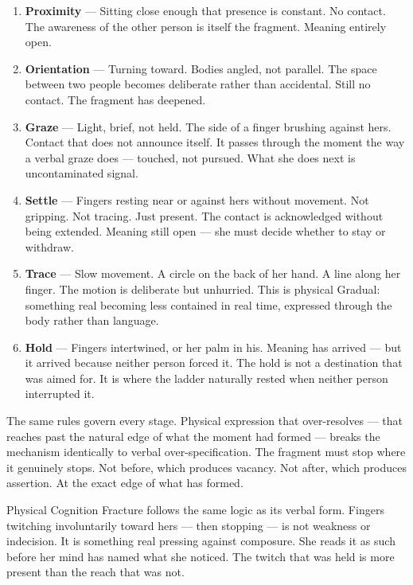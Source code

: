 \begin{enumerate}[leftmargin=*, label=\textbf{\arabic*.}]
\item \textbf{Proximity} --- Sitting close enough that presence is constant. 
No contact. The awareness of the other person is itself the fragment. 
Meaning entirely open.

\item \textbf{Orientation} --- Turning toward. Bodies angled, not parallel. 
The space between two people becomes deliberate rather than accidental. 
Still no contact. The fragment has deepened.

\item \textbf{Graze} --- Light, brief, not held. The side of a finger brushing 
against hers. Contact that does not announce itself. It passes through the 
moment the way a verbal graze does --- touched, not pursued. What she does 
next is uncontaminated signal.

\item \textbf{Settle} --- Fingers resting near or against hers without movement. 
Not gripping. Not tracing. Just present. The contact is acknowledged without 
being extended. Meaning still open --- she must decide whether to stay 
or withdraw.

\item \textbf{Trace} --- Slow movement. A circle on the back of her hand. 
A line along her finger. The motion is deliberate but unhurried. This is 
physical Gradual: something real becoming less contained in real time, 
expressed through the body rather than language.

\item \textbf{Hold} --- Fingers intertwined, or her palm in his. 
Meaning has arrived --- but it arrived because neither person forced it. 
The hold is not a destination that was aimed for. It is where the ladder 
naturally rested when neither person interrupted it.
\end{enumerate}

The same rules govern every stage. Physical expression that over-resolves 
--- that reaches past the natural edge of what the moment had formed --- 
breaks the mechanism identically to verbal over-specification. The fragment 
must stop where it genuinely stops. Not before, which produces vacancy. 
Not after, which produces assertion. At the exact edge of what has formed.

Physical Cognition Fracture follows the same logic as its verbal form. 
Fingers twitching involuntarily toward hers --- then stopping --- is not 
weakness or indecision. It is something real pressing against composure. 
She reads it as such before her mind has named what she noticed. The twitch 
that was held is more present than the reach that was not.

